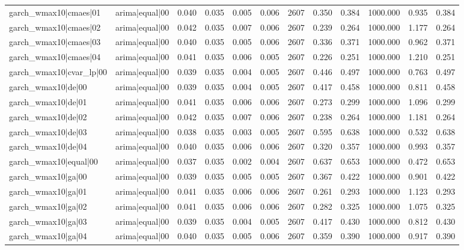 \begin{table}
\begin{tabular}{llrrrrrrrrrr}
garch\_wmax10|cmaes|01 & arima|equal|00 & 0.040 & 0.035 & 0.005 & 0.006 & 2607 & 0.350 & 0.384 & 1000.000 & 0.935 & 0.384 \\
garch\_wmax10|cmaes|02 & arima|equal|00 & 0.042 & 0.035 & 0.007 & 0.006 & 2607 & 0.239 & 0.264 & 1000.000 & 1.177 & 0.264 \\
garch\_wmax10|cmaes|03 & arima|equal|00 & 0.040 & 0.035 & 0.005 & 0.006 & 2607 & 0.336 & 0.371 & 1000.000 & 0.962 & 0.371 \\
garch\_wmax10|cmaes|04 & arima|equal|00 & 0.041 & 0.035 & 0.006 & 0.005 & 2607 & 0.226 & 0.251 & 1000.000 & 1.210 & 0.251 \\
garch\_wmax10|cvar\_lp|00 & arima|equal|00 & 0.039 & 0.035 & 0.004 & 0.005 & 2607 & 0.446 & 0.497 & 1000.000 & 0.763 & 0.497 \\
garch\_wmax10|de|00 & arima|equal|00 & 0.039 & 0.035 & 0.004 & 0.005 & 2607 & 0.417 & 0.458 & 1000.000 & 0.811 & 0.458 \\
garch\_wmax10|de|01 & arima|equal|00 & 0.041 & 0.035 & 0.006 & 0.006 & 2607 & 0.273 & 0.299 & 1000.000 & 1.096 & 0.299 \\
garch\_wmax10|de|02 & arima|equal|00 & 0.042 & 0.035 & 0.007 & 0.006 & 2607 & 0.238 & 0.264 & 1000.000 & 1.181 & 0.264 \\
garch\_wmax10|de|03 & arima|equal|00 & 0.038 & 0.035 & 0.003 & 0.005 & 2607 & 0.595 & 0.638 & 1000.000 & 0.532 & 0.638 \\
garch\_wmax10|de|04 & arima|equal|00 & 0.040 & 0.035 & 0.006 & 0.006 & 2607 & 0.320 & 0.357 & 1000.000 & 0.993 & 0.357 \\
garch\_wmax10|equal|00 & arima|equal|00 & 0.037 & 0.035 & 0.002 & 0.004 & 2607 & 0.637 & 0.653 & 1000.000 & 0.472 & 0.653 \\
garch\_wmax10|ga|00 & arima|equal|00 & 0.039 & 0.035 & 0.005 & 0.005 & 2607 & 0.367 & 0.422 & 1000.000 & 0.901 & 0.422 \\
garch\_wmax10|ga|01 & arima|equal|00 & 0.041 & 0.035 & 0.006 & 0.006 & 2607 & 0.261 & 0.293 & 1000.000 & 1.123 & 0.293 \\
garch\_wmax10|ga|02 & arima|equal|00 & 0.041 & 0.035 & 0.006 & 0.006 & 2607 & 0.282 & 0.325 & 1000.000 & 1.075 & 0.325 \\
garch\_wmax10|ga|03 & arima|equal|00 & 0.039 & 0.035 & 0.004 & 0.005 & 2607 & 0.417 & 0.430 & 1000.000 & 0.812 & 0.430 \\
garch\_wmax10|ga|04 & arima|equal|00 & 0.040 & 0.035 & 0.005 & 0.006 & 2607 & 0.359 & 0.390 & 1000.000 & 0.917 & 0.390 \\

\end{tabular}
\end{table}
